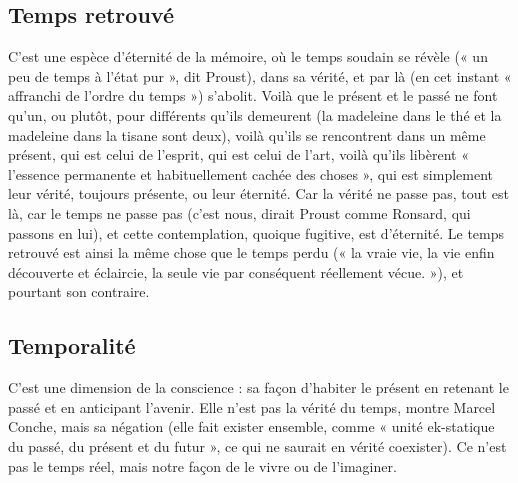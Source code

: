 \subsection{Temps retrouvé}
C’est une espèce d’éternité de la mémoire, où le temps
soudain se révèle (« un peu de temps à l’état pur », dit
Proust), dans sa vérité, et par là (en cet instant « affranchi de l’ordre du
temps ») s’abolit. Voilà que le présent et le passé ne font qu’un, ou plutôt, pour
différents qu’ils demeurent (la madeleine dans le thé et la madeleine dans la
tisane sont deux), voilà qu’ils se rencontrent dans un même présent, qui est
celui de l'esprit, qui est celui de l’art, voilà qu’ils libèrent « l’essence permanente
et habituellement cachée des choses », qui est simplement leur vérité, toujours
présente, ou leur éternité. Car la vérité ne passe pas, tout est là, car le temps ne
passe pas (c’est nous, dirait Proust comme Ronsard, qui passons en lui), et cette
contemplation, quoique fugitive, est d’éternité. Le temps retrouvé est ainsi la
même chose que le temps perdu (« la vraie vie, la vie enfin découverte et
éclaircie, la seule vie par conséquent réellement vécue. »), et pourtant son
contraire.

\subsection{Temporalité}
C’est une dimension de la conscience : sa façon d’habiter
le présent en retenant le passé et en anticipant l'avenir.
Elle n’est pas la vérité du temps, montre Marcel Conche, mais sa négation (elle
fait exister ensemble, comme « unité ek-statique du passé, du présent et du
futur », ce qui ne saurait en vérité coexister). Ce n’est pas le temps réel, mais
notre façon de le vivre ou de l'imaginer.

